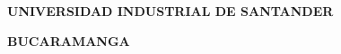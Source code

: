 \begin{titlepage}
\thispagestyle{empty}
\begin{center}
\vspace*{1.5cm}
{\Large\bfseries\MakeUppercase{\Title}\par}

\vfill

{\Large\bfseries\MakeUppercase{\Author}\par}

\vfill

{\large\bfseries UNIVERSIDAD INDUSTRIAL DE SANTANDER\par}
{\large\bfseries\MakeUppercase{\FacultyName}\par}
{\large\bfseries\MakeUppercase{\SchoolName}\par}
{\large\bfseries BUCARAMANGA\par}
{\large\bfseries\ThesisYear\par}
\end{center}
\end{titlepage}
